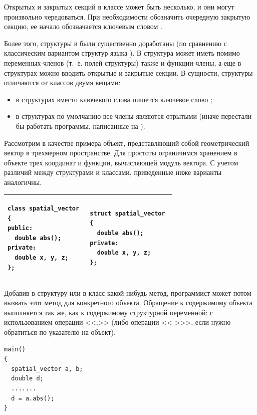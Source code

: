 Открытых и закрытых секций в классе может быть несколько, и они могут произвольно чередоваться. При необходимости
обозначить очередную закрытую секцию, ее начало обозначается ключевым словом .

Более того, структуры в  были существенно доработаны (по сравнению с  классическим вариантом 
структур языка ). 
В 
структура может иметь помимо переменных-членов (т.~е. полей структуры) также и функции-члены, а еще в структурах можно
вводить открытые и закрытые секции. В сущности, структуры отличаются от классов двумя вещами:

\begin{itemize}
\item в структурах вместо ключевого слова  пишется ключевое слово
;
\item в структурах по умолчанию все члены являются отрытыми (иначе перестали бы работать программы, написанные на ). 
\end{itemize}
Рассмотрим в качестве примера объект, представляющий собой геометрический вектор в трехмерном пространстве. Для простоты
ограничимся хранением в объекте трех координат и функции, вычисляющей модуль вектора. С учетом различий между
структурами и классами, приведенные ниже варианты аналогичны.
\begin{center}
\begin{tabular}{|p{}|p{}|}
\hline
\begin{lstlisting}
class spatial_vector 
{
public:
  double abs();
private:
  double x, y, z;
};
\end{lstlisting}
&
\begin{lstlisting}
struct spatial_vector 
{
  double abs();
private:
  double x, y, z;
};
\end{lstlisting}
\\\hline
\end{tabular}
\end{center}

Добавив в структуру или в класс какой-нибудь метод, программист может потом вызвать этот метод для конкретного объекта.
Обращение к содержимому объекта выполняется так же, как к содержимому структурной переменной: с использованием операции
<<.>> (либо операции <<->{}>>, если нужно обратиться по указателю на объект).
\begin{lstlisting}
main() 
{
  spatial_vector a, b;
  double d;
  .......
  d = a.abs();
}
\end{lstlisting}

